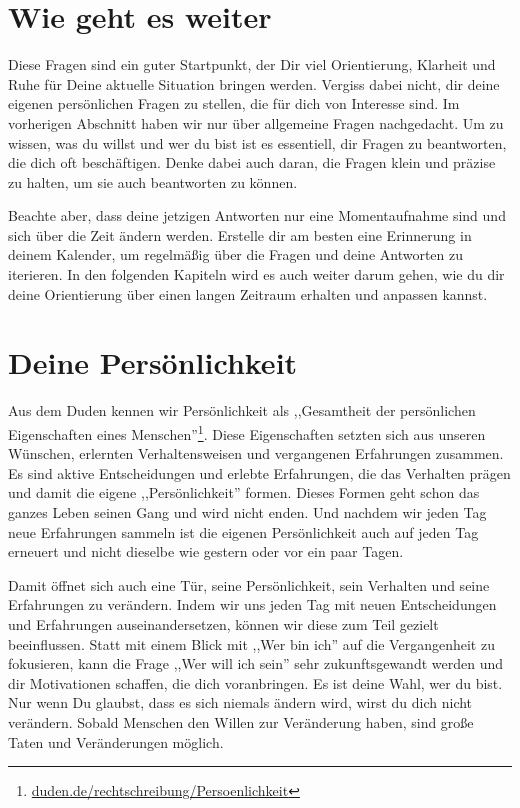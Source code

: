 \documentclass[../Lebensziel.tex]{subfiles}
\begin{document}
\section{Wie geht es weiter}
Diese Fragen sind ein guter Startpunkt, der Dir viel Orientierung, Klarheit und Ruhe für Deine aktuelle Situation bringen werden. Vergiss dabei nicht, dir deine eigenen persönlichen Fragen zu stellen, die für dich von Interesse sind. Im vorherigen Abschnitt haben wir nur über allgemeine Fragen nachgedacht. Um zu wissen, was du willst und wer du bist ist es essentiell, dir Fragen zu beantworten, die dich oft beschäftigen. Denke dabei auch daran, die Fragen klein und präzise zu halten, um sie auch beantworten zu können.

Beachte aber, dass deine jetzigen Antworten nur eine Momentaufnahme sind und sich über die Zeit ändern werden. Erstelle dir am besten eine Erinnerung in deinem Kalender, um regelmäßig über die Fragen und deine Antworten zu iterieren.
In den folgenden Kapiteln wird es auch weiter darum gehen, wie du dir deine Orientierung über einen langen Zeitraum erhalten und anpassen kannst.

\section{Deine Persönlichkeit}
Aus dem Duden kennen wir Persönlichkeit als ,,Gesamtheit der persönlichen Eigenschaften eines Menschen''\footnote{\href{https://www.duden.de/rechtschreibung/Persoenlichkeit}{duden.de/rechtschreibung/Persoenlichkeit}}. Diese Eigenschaften setzten sich aus unseren Wünschen, erlernten Verhaltensweisen und vergangenen Erfahrungen zusammen.
Es sind aktive Entscheidungen und erlebte Erfahrungen, die das Verhalten prägen und damit die eigene ,,Persönlichkeit'' formen. Dieses Formen geht schon das ganzes Leben seinen Gang und wird nicht enden. Und nachdem wir jeden Tag neue Erfahrungen sammeln ist die eigenen Persönlichkeit auch auf jeden Tag erneuert und nicht dieselbe wie gestern oder vor ein paar Tagen.

Damit öffnet sich auch eine Tür, seine Persönlichkeit, sein Verhalten und seine Erfahrungen zu verändern. Indem wir uns jeden Tag mit neuen Entscheidungen und Erfahrungen auseinandersetzen, können wir diese zum Teil gezielt beeinflussen. Statt mit einem Blick mit ,,Wer bin ich'' auf die Vergangenheit zu fokusieren, kann die Frage ,,Wer will ich sein'' sehr zukunftsgewandt werden und dir Motivationen schaffen, die dich voranbringen. Es ist deine Wahl, wer du bist.
Nur wenn Du glaubst, dass es sich niemals ändern wird, wirst du dich nicht verändern. Sobald Menschen den Willen zur Veränderung haben, sind große Taten und Veränderungen möglich.
\end{document}
